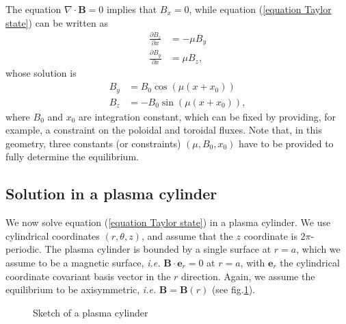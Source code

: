 \documentclass[my_thesis.tex]{subfiles}
\begin{document}
The equation $\nabla\cdot\mathbf{B}=0$ implies that $B_x=0$, while equation (\ref{equation Taylor state}) can be written as
\begin{align}
	\frac{\partial B_z}{\partial x} &= -\mu B_y\\
	\frac{\partial B_y}{\partial x} &= \mu B_z,
\end{align}
whose solution is
\begin{align}
	B_y &= B_0 \cos(\mu (x + x_0))\\
	B_z &= -B_0 \sin(\mu (x + x_0)),
\end{align}
where $B_0$ and $x_0$ are integration constant, which can be fixed by providing, for example, a constraint on the poloidal and toroidal fluxes. Note that, in this geometry, three constants (or constraints) $(\mu,B_0,x_0)$ have to be provided to fully determine the equilibrium.

\subsection{Solution in a plasma cylinder}
We now solve equation (\ref{equation Taylor state}) in a plasma cylinder. We use cylindrical coordinates $(r,\theta,z)$, and assume that the $z$ coordinate is $2\pi$-periodic. The plasma cylinder is bounded by a single surface at $r=a$, which we assume to be a magnetic surface,  \textit{i.e.} $\mathbf{B}\cdot\mathbf{e}_r=0$ at $r=a$, with $\mathbf{e}_r$ the cylindrical coordinate covariant basis vector in the $r$ direction. Again, we assume the equilibrium to be axisymmetric, \textit{i.e.} $\mathbf{B}=\mathbf{B}(r)$ (see fig.\ref{fig. cylinder sketch}).

\begin{figure}
	\centering
	\caption{Sketch of a plasma cylinder}
	\label{fig. cylinder sketch}
\end{figure}
\end{document}

